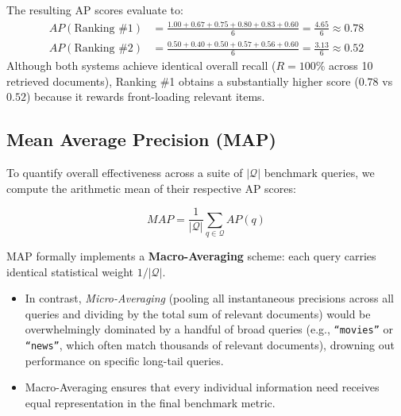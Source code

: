 \begin{example}
The resulting AP scores evaluate to:
\begin{align*}
AP(\text{Ranking \#1}) &= \frac{1.00 + 0.67 + 0.75 + 0.80 + 0.83 + 0.60}{6} = \frac{4.65}{6} \approx \mathbf{0.78} \\
AP(\text{Ranking \#2}) &= \frac{0.50 + 0.40 + 0.50 + 0.57 + 0.56 + 0.60}{6} = \frac{3.13}{6} \approx \mathbf{0.52}
\end{align*}
Although both systems achieve identical overall recall ($R = 100\%$ across 10 retrieved documents), Ranking \#1 obtains a substantially higher score ($0.78$ vs $0.52$) because it rewards front-loading relevant items.
\end{example}

\subsection{Mean Average Precision (MAP)}
To quantify overall effectiveness across a suite of $|\mathcal{Q}|$ benchmark queries, we compute the arithmetic mean of their respective AP scores:

\begin{definition}
\begin{equation}
MAP = \frac{1}{|\mathcal{Q}|} \sum_{q \in \mathcal{Q}} AP(q)
\end{equation}
\end{definition}

\begin{property}
MAP formally implements a \textbf{Macro-Averaging} scheme: each query carries identical statistical weight $1/|\mathcal{Q}|$.
\begin{itemize}
    \item In contrast, \textit{Micro-Averaging} (pooling all instantaneous precisions across all queries and dividing by the total sum of relevant documents) would be overwhelmingly dominated by a handful of broad queries (e.g., \texttt{``movies''} or \texttt{``news''}, which often match thousands of relevant documents), drowning out performance on specific long-tail queries.
    \item Macro-Averaging ensures that every individual information need receives equal representation in the final benchmark metric.
\end{itemize}
\end{property}

